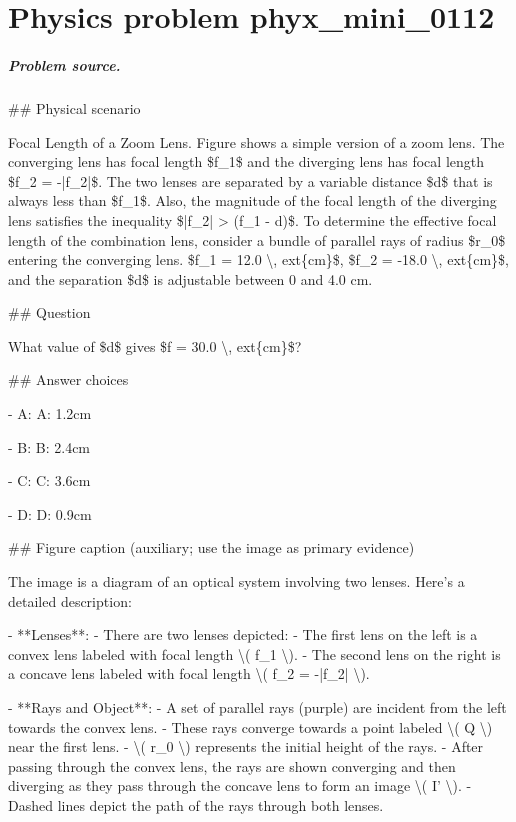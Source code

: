 
\chapter{Physics problem phyx\_mini\_0112}
\label{ch:PhyXMiniProblems_problem_phyx_mini_0112}

\paragraph{Problem source.}
\#\# Physical scenario

Focal Length of a Zoom Lens. Figure shows a simple version of a zoom lens. The converging lens has focal length \$f\_1\$ and the diverging lens has focal length \$f\_2 = -|f\_2|\$. The two lenses are separated by a variable distance \$d\$ that is always less than \$f\_1\$. Also, the magnitude of the focal length of the diverging lens satisfies the inequality \$|f\_2| > (f\_1 - d)\$. To determine the effective focal length of the combination lens, consider a bundle of parallel rays of radius \$r\_0\$ entering the converging lens. \$f\_1 = 12.0 \textbackslash{}, 	ext\{cm\}\$, \$f\_2 = -18.0 \textbackslash{}, 	ext\{cm\}\$, and the separation \$d\$ is adjustable between 0 and 4.0 cm.

\#\# Question

What value of \$d\$ gives \$f = 30.0 \textbackslash{}, 	ext\{cm\}\$?

\#\# Answer choices

- A: A: 1.2cm

- B: B: 2.4cm

- C: C: 3.6cm

- D: D: 0.9cm

\#\# Figure caption (auxiliary; use the image as primary evidence)

The image is a diagram of an optical system involving two lenses. Here’s a detailed description:

- **Lenses**: 
  - There are two lenses depicted:
    - The first lens on the left is a convex lens labeled with focal length \textbackslash{}( f\_1 \textbackslash{}).
    - The second lens on the right is a concave lens labeled with focal length \textbackslash{}( f\_2 = -|f\_2| \textbackslash{}).

- **Rays and Object**:
  - A set of parallel rays (purple) are incident from the left towards the convex lens.
  - These rays converge towards a point labeled \textbackslash{}( Q \textbackslash{}) near the first lens.
  - \textbackslash{}( r\_0 \textbackslash{}) represents the initial height of the rays.
  - After passing through the convex lens, the rays are shown converging and then diverging as they pass through the concave lens to form an image \textbackslash{}( I' \textbackslash{}).
  - Dashed lines depict the path of the rays through both lenses.

